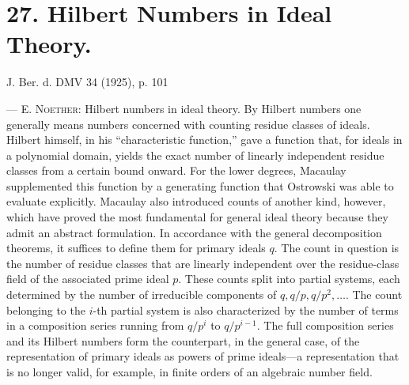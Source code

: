 \documentclass[11pt]{article}
\begin{document}
\section*{27. Hilbert Numbers in Ideal Theory.}

\begin{center}
J. Ber. d. DMV 34 (1925), p. 101
\end{center}

--- \textsc{E. Noether}: Hilbert numbers in ideal theory. By Hilbert numbers one generally means numbers concerned with counting residue classes of ideals. Hilbert himself, in his ``characteristic function,'' gave a function that, for ideals in a polynomial domain, yields the exact number of linearly independent residue classes from a certain bound onward. For the lower degrees, Macaulay supplemented this function by a generating function that Ostrowski was able to evaluate explicitly. Macaulay also introduced counts of another kind, however, which have proved the most fundamental for general ideal theory because they admit an abstract formulation. In accordance with the general decomposition theorems, it suffices to define them for primary ideals $q$. The count in question is the number of residue classes that are linearly independent over the residue-class field of the associated prime ideal $p$. These counts split into partial systems, each determined by the number of irreducible components of $q,q/p,q/p^2,\ldots$. The count belonging to the $i$-th partial system is also characterized by the number of terms in a composition series running from $q/p^i$ to $q/p^{i-1}$. The full composition series and its Hilbert numbers form the counterpart, in the general case, of the representation of primary ideals as powers of prime ideals---a representation that is no longer valid, for example, in finite orders of an algebraic number field.
\end{document}

